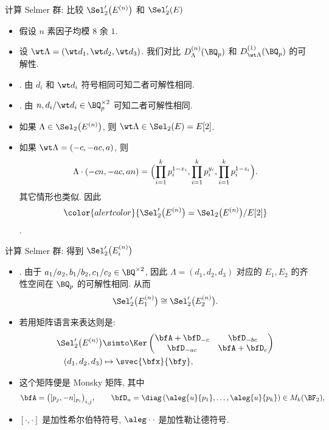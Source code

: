 \documentclass[12pt,handout]{ctexbeamer}
\newcommand\markatt[1]{{\color{alertcolor}{#1}}}
\begin{document}
\begin{frame}{计算 Selmer 群: 比较 $\Sel_2'\bigl(E^{(n)}\bigr)$ 和 $\Sel_2'(E)$}
\begin{itemize}
\item 假设 $n$ 素因子均模 $8$ 余 $1$.
\item 设 $\wt\Lambda=(\wt d_1,\wt d_2,\wt d_3)$.
我们对比 $D_\Lambda^{(n)}(\BQ_p)$ 和 $D_{\wt\Lambda}^{(1)}(\BQ_p)$ 的可解性.
\item \markatt{$\bm{p=\infty}$}. 由 $d_i$ 和 $\wt d_i$ 符号相同可知二者可解性相同.
\item \markatt{$\bm{p\mid abc}$}. 由 $n,d_i/\wt d_i\in\BQ_p^{\times2}$ 可知二者可解性相同.
\item 如果 $\Lambda\in\Sel_2\bigl(E^{(n)}\bigr)$, 则 $\wt\Lambda\in \Sel_2(E)=E[2]$.
\item 如果 $\wt\Lambda=(-c,-ac,a)$, 则
\[\Lambda\cdot(-cn,-ac,an)=\Bigl(\prod_{i=1}^k p_i^{1-x_i},\prod_{i=1}^k p_i^{y_i},\prod_{i=1}^k p_i^{1-z_i}\Bigr).\]
其它情形也类似.
\onslide<+-> 
因此
\[\markatt{\Sel_2'\bigl(E^{(n)}\bigr)=\Sel_2\bigl(E^{(n)}\bigr)/E[2]}\]
\markatt{中每个元素都有唯一代表元 $(d_1,d_2,d_3)$ 满足 $0<d_i\mid n$}.
\end{itemize}
\end{frame}


\begin{frame}{计算 Selmer 群: 得到 $\Sel_2'\bigl(E_i^{(n)}\bigr)$}
\begin{itemize}
\item \markatt{$\bm{p\mid n}$}.
\onslide<+-> 
由于 $a_1/a_2,b_1/b_2,c_1/c_2\in \BQ^{\times2}$, 因此 $\Lambda=(d_1,d_2,d_3)$ 对应的 $E_1,E_2$ 的齐性空间在 $\BQ_p$ 的可解性相同.
\onslide<+-> 
从而
\[\Sel_2'\bigl(E_1^{(n)}\bigr)\cong \Sel_2'\bigl(E_2^{(n)}\bigr).\]
\item 若用矩阵语言来表达则是:
\[\begin{split}
\Sel_2'\bigl(E^{(n)}\bigr)&\simto \Ker\begin{pmatrix}
\bfA+\bfD_{-c}&\bfD_{-bc}\\\bfD_{-ac}&\bfA+\bfD_c
\end{pmatrix}\\
(d_1,d_2,d_3)&\mapsto \svec{\bfx}{\bfy},\end{split}\]
\item 这个矩阵便是 Monsky 矩阵, 其中
\[\bfA=\bigl([p_j,-n]_{p_i}\bigr)_{i,j},\qquad
\bfD_u=\diag\left(\aleg{u}{p_1},\dots,\aleg{u}{p_k}\right)\in M_k(\BF_2),\]
\vspace{-\baselineskip}
\item $[\cdot,\cdot]$ 是加性希尔伯特符号, $\aleg\cdot\cdot$ 是加性勒让德符号.
\end{itemize}
\end{frame}
\end{document}
